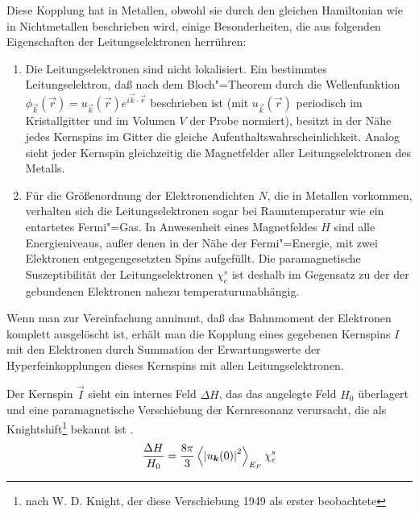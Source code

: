 Diese Kopplung hat in Metallen, obwohl sie durch den gleichen Hamiltonian wie in Nichtmetallen
beschrieben wird, einige Besonderheiten, die aus folgenden Eigenschaften der Leitungselektronen
herrühren:

 \begin{enumerate}
	\item Die Leitungselektronen sind nicht lokalisiert. Ein bestimmtes Leitungselektron, daß nach
		dem Bloch"=Theorem durch die Wellenfunktion $\phi_{\vec k}(\vec r)=u_{\vec k}(\vec
		r)e^{i\vec k\cdot\vec r}$ beschrieben ist (mit $u_{\vec k}(\vec r)$ periodisch im
		Kristallgitter und im Volumen $V$ der Probe normiert), besitzt in der Nähe jedes Kernspins
		im Gitter die gleiche Aufenthaltswahrscheinlichkeit. Analog sieht jeder Kernspin
		gleichzeitig die Magnetfelder aller Leitungselektronen des Metalls.
	\item Für die Größenordnung der Elektronendichten $N$, die in Metallen vorkommen, verhalten
		sich die Leitungselektronen sogar bei Raumtemperatur wie ein entartetes Fermi"=Gas. In
		Anwesenheit eines Magnetfeldes $H$ sind alle Energieniveaus, außer denen in der Nähe
		der Fermi"=Energie, mit zwei Elektronen entgegengesetzten Spins aufgefüllt. Die paramagnetische Suszeptibilität
		der Leitungselektronen $\chi_e^s$ ist deshalb im Gegensatz zu der der gebundenen
		Elektronen nahezu temperaturunabhängig.
 \end{enumerate}

Wenn man zur Vereinfachung annimmt, daß das Bahnmoment der Elektronen komplett ausgelöscht ist,
erhält man die Kopplung eines gegebenen Kernspins $I$ mit den Elektronen durch Summation der
Erwartungswerte der Hyperfeinkopplungen dieses Kernspins mit allen Leitungselektronen.

Der Kernspin $\vec I$ sieht ein internes Feld $\Delta H$, das das angelegte Feld $H_0$
überlagert und eine paramagnetische Verschiebung der Kernresonanz verursacht, die als
Knightshift\footnote{nach W. D. Knight, der diese Verschiebung 1949 als erster beobachtete}
bekannt ist \cite{KNIGHT49}.
	\begin{equation}
		\label{eqn:knightshift}
		\frac{\Delta H}{H_0}=\frac{8\pi}{3}\left<\abs{u_{\vec k}(0)}^2\right>_{E_F}\chi_e^s
	\end{equation}

